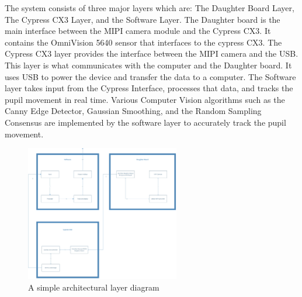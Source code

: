 The system consists of three major layers which are: The Daughter Board Layer, The Cypress CX3 Layer, and the Software Layer. The Daughter board is the main interface between the MIPI camera module and the Cypress CX3. It contains the OmniVision 5640 sensor that interfaces to the cypress CX3.
The Cypress CX3 layer provides the interface between the MIPI camera and the USB. This layer is what communicates with the computer and the Daughter board. It uses USB to power the device and transfer the data to a computer. 
The Software layer takes input from the Cypress Interface, processes that data, and tracks the pupil movement in real time. Various Computer Vision algorithms such as the Canny Edge Detector, Gaussian Smoothing, and the Random Sampling Consensus are implemented by the software layer to accurately track the pupil movement.



\begin{figure}[h!]
	\centering
 	\includegraphics[width=0.60\textwidth]{images/Diagram_WHOLE.jpg}
 \caption{A simple architectural layer diagram}
\end{figure}

